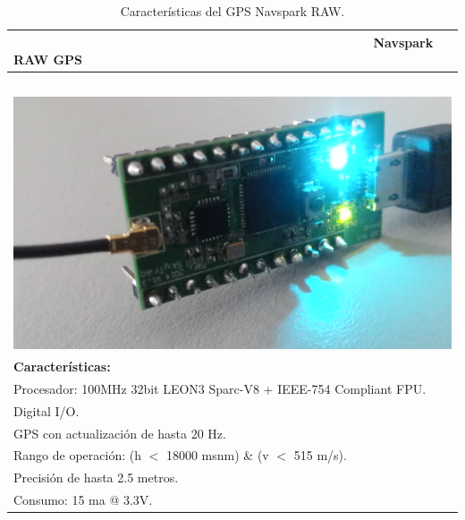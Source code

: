 \begin{table}[!htb]
\begin{center}
\caption{Características del GPS Navspark RAW.}
\begin{tabular}{|l|}
	\hline
	        \ \ \ \ \ \ \ \ \ \ \ \ \ \ \ \ \ \ \ \ \ \ \ \ \ \ \ \ \ \ \ \ \ \ \ \ \ \ \ \ \ \ \ \ \ \ \ \ \ \ \textbf{Navspark RAW GPS} \\
	\hline
		\\  \ \ \ \ \ \ \ \ \ \ \ \ \ \ \ \ \ \ \ \ \ \ \ \ \ \ \ \ \ \ \ \ \ \ \ \ \ \ \ \ \includegraphics[width=0.37\linewidth]{Figures/NavGPS}
		\label{fig:nsraw}\\
	
	\textbf{Características:}\\
		\tabitem Procesador: 100MHz 32bit LEON3 Sparc-V8 + IEEE-754 Compliant FPU.\\
		\tabitem 17 Digital I/O.\\
		\tabitem GPS con actualización de hasta 20 Hz.\\
		\tabitem Rango de operación: (h $<$ 18000 msnm) \& (v $<$ 515 m/s).\\
		\tabitem Precisión de hasta 2.5 metros.\\
		\tabitem Consumo: 15 ma @ 3.3V.\\
	\hline
\end{tabular}
\end{center}
\end{table}

